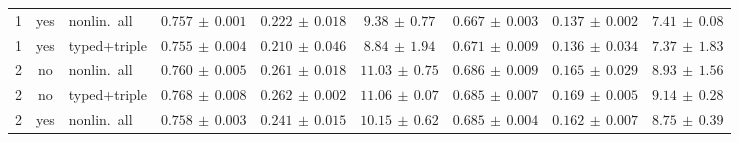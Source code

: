 \begin{table}[H]
{\begin{tabular}{ccl ccc ccc}
    1 & yes & nonlin.\ all     & $0.757{\scriptstyle\,\pm\,0.001}$ & $0.222{\scriptstyle\,\pm\,0.018}$ & $9.38{\scriptstyle\,\pm\,0.77}$ & $0.667{\scriptstyle\,\pm\,0.003}$ & $0.137{\scriptstyle\,\pm\,0.002}$ & $7.41{\scriptstyle\,\pm\,0.08}$ \\
    1 & yes & typed+triple     & $0.755{\scriptstyle\,\pm\,0.004}$ & $0.210{\scriptstyle\,\pm\,0.046}$ & $8.84{\scriptstyle\,\pm\,1.94}$ & $0.671{\scriptstyle\,\pm\,0.009}$ & $0.136{\scriptstyle\,\pm\,0.034}$ & $7.37{\scriptstyle\,\pm\,1.83}$ \\
    \midrule
    2 & no  & nonlin.\ all     & $0.760{\scriptstyle\,\pm\,0.005}$ & $0.261{\scriptstyle\,\pm\,0.018}$ & $11.03{\scriptstyle\,\pm\,0.75}$ & $0.686{\scriptstyle\,\pm\,0.009}$ & $0.165{\scriptstyle\,\pm\,0.029}$ & $8.93{\scriptstyle\,\pm\,1.56}$ \\
    2 & no  & typed+triple     & $0.768{\scriptstyle\,\pm\,0.008}$ & $0.262{\scriptstyle\,\pm\,0.002}$ & $11.06{\scriptstyle\,\pm\,0.07}$ & $0.685{\scriptstyle\,\pm\,0.007}$ & $0.169{\scriptstyle\,\pm\,0.005}$ & $9.14{\scriptstyle\,\pm\,0.28}$ \\
    \addlinespace[2pt]
    2 & yes & nonlin.\ all     & $0.758{\scriptstyle\,\pm\,0.003}$ & $0.241{\scriptstyle\,\pm\,0.015}$ & $10.15{\scriptstyle\,\pm\,0.62}$ & $0.685{\scriptstyle\,\pm\,0.004}$ & $0.162{\scriptstyle\,\pm\,0.007}$ & $8.75{\scriptstyle\,\pm\,0.39}$ \\

\end{tabular}}
\end{table}
